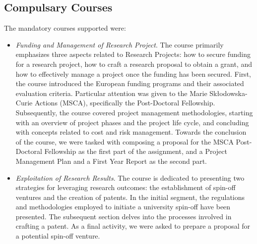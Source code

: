 \subsection{Compulsary Courses}
The mandatory courses supported were:
\begin{itemize}
    \item \textit{Funding and Management of Research Project}. The course primarily emphasizes three aspects related to Research Projects: how to secure funding for a research project, how to craft a research proposal to obtain a grant, and how to effectively manage a project once the funding has been secured. First, the course introduced the European funding programs and their associated evaluation criteria. Particular attention was given to the Marie Skłodowska-Curie Actions (MSCA), specifically the Post-Doctoral Fellowship. Subsequently, the course covered project management methodologies, starting with an overview of project phases and the project life cycle, and concluding with concepts related to cost and risk management. Towards the conclusion of the course, we were tasked with composing a proposal for the MSCA Post-Doctoral Fellowship as the first part of the assignment, and a Project Management Plan and a First Year Report as the second part.
    \item \textit{Exploitation of Research Results}. The course is dedicated to presenting two strategies for leveraging research outcomes: the establishment of spin-off ventures and the creation of patents. In the initial segment, the regulations and methodologies employed to initiate a university spin-off have been presented. The subsequent section delves into the processes involved in crafting a patent. As a final activity, we were asked to prepare a proposal for a potential spin-off venture.
\end{itemize}